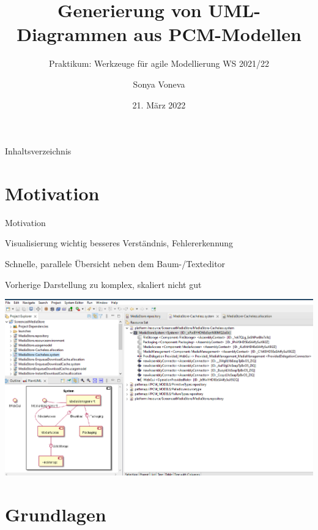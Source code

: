 \documentclass{sdqbeamer}
\title{Generierung von UML-Diagrammen aus PCM-Modellen}
\subtitle{Praktikum: Werkzeuge für agile Modellierung WS 2021/22}
\author{Sonya Voneva}
\date[21.03.22]{21. März 2022}
\begin{document}
\KITtitleframe

\begin{frame}{Inhaltsverzeichnis}
\tableofcontents
\end{frame}

\section{Motivation}
\begin{frame}{Motivation}
\begin{greenblock}{Visualisierung wichtig}
besseres Verständnis, Fehlererkennung  \texttt{}
\end{greenblock}
\pause
\begin{greenblock}{Schnelle, parallele Übersicht}
neben dem Baum-/Texteditor  \texttt{}
\end{greenblock}
\pause
\begin{greenblock}{Vorherige Darstellung}
zu komplex, skaliert nicht gut  \texttt{}
\end{greenblock}
\end{frame}

\begin{frame}
    \includegraphics[width=\textwidth]{plantuml+repo.png}
\end{frame}

\section{Grundlagen}
\end{document}
